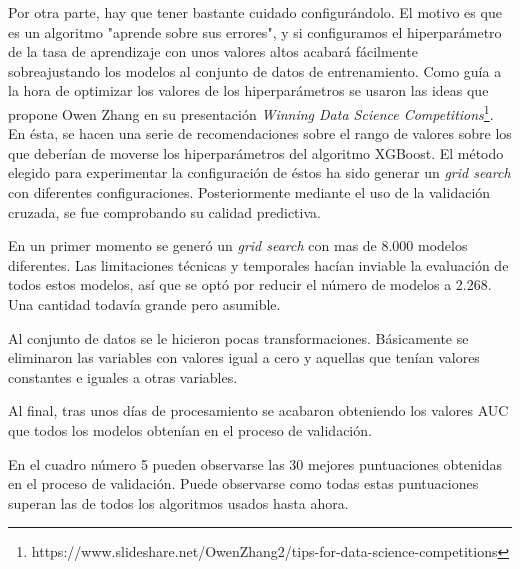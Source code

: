 \documentclass[11pt,a4paper,spanish]{article} %
\begin{document}
Por otra parte, hay que tener bastante cuidado configurándolo. El motivo es que es un algoritmo "aprende sobre sus errores", y si configuramos el hiperparámetro de la tasa de aprendizaje con unos valores altos acabará fácilmente sobreajustando los modelos al conjunto de datos de entrenamiento. Como guía a la hora de optimizar los valores de los hiperparámetros se usaron las ideas que propone Owen Zhang en su presentación \textit{Winning Data Science Competitions}\footnote{https://www.slideshare.net/OwenZhang2/tips-for-data-science-competitions}. En ésta, se hacen una serie de recomendaciones sobre el rango de valores sobre los que deberían de moverse los hiperparámetros del algoritmo XGBoost. El método elegido para experimentar la configuración de éstos ha sido generar un \textit{grid search} con diferentes configuraciones. Posteriormente mediante el uso de la validación cruzada, se fue comprobando su calidad predictiva. 

En un primer momento se generó un \textit{grid search} con mas de 8.000 modelos diferentes. Las limitaciones técnicas y temporales hacían inviable la evaluación de todos estos modelos, así que se optó por reducir el número de modelos a 2.268. Una cantidad todavía grande pero asumible. 

Al conjunto de datos se le hicieron pocas transformaciones. Básicamente se eliminaron las variables con valores igual a cero y aquellas que tenían valores constantes e iguales a otras variables.

Al final, tras unos días de procesamiento se acabaron obteniendo los valores AUC que todos los modelos obtenían en el proceso de validación.  

\vspace{0.5cm}

En el cuadro número 5 pueden observarse las 30 mejores puntuaciones obtenidas en el proceso de validación. Puede observarse como todas estas puntuaciones superan las de todos los algoritmos usados hasta ahora. 

\vspace{1.25cm}
\end{document}
